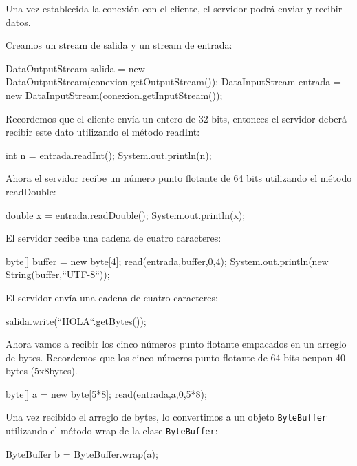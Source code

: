 \documentclass[11pt,a4paper,oneside]{book}
\begin{document}
Una vez establecida la conexión con el cliente, el servidor podrá enviar y recibir datos.

Creamos un stream de salida y un stream de entrada:

\begin{SourceCode}
DataOutputStream salida = new DataOutputStream(conexion.getOutputStream());
DataInputStream entrada = new DataInputStream(conexion.getInputStream());
\end{SourceCode}

Recordemos que el cliente envía un entero de 32 bits, entonces el servidor deberá recibir este dato utilizando el método readInt:

\begin{SourceCode}
int n = entrada.readInt();
System.out.println(n);
\end{SourceCode}

Ahora el servidor recibe un número punto flotante de 64 bits utilizando el método readDouble:

\begin{SourceCode}
double x = entrada.readDouble();
System.out.println(x);
\end{SourceCode}

El servidor recibe una cadena de cuatro caracteres:

\begin{SourceCode}
byte[] buffer = new byte[4];
read(entrada,buffer,0,4);
System.out.println(new String(buffer,``UTF-8``));
\end{SourceCode}

El servidor envía una cadena de cuatro caracteres:

\begin{SourceCode}
salida.write(``HOLA``.getBytes());
\end{SourceCode}

Ahora vamos a recibir los cinco números punto flotante empacados en un arreglo de bytes.
Recordemos que los cinco números punto flotante de 64 bits ocupan 40 bytes (5x8bytes).

\begin{SourceCode}
byte[] a = new byte[5*8];
read(entrada,a,0,5*8);
\end{SourceCode}

Una vez recibido el arreglo de bytes, lo convertimos a un objeto \texttt{ByteBuffer} utilizando el método wrap de la clase \texttt{ByteBuffer}:

\begin{SourceCode}
ByteBuffer b = ByteBuffer.wrap(a);
\end{SourceCode}
\end{document}
